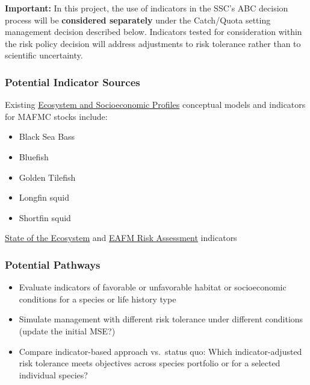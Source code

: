 \documentclass[
]{article}
\providecommand{\tightlist}{%
  \setlength{\itemsep}{0pt}\setlength{\parskip}{0pt}}
\begin{document}
\textbf{Important:} In this project, the use of indicators in the SSC's ABC decision process will be \textbf{considered separately} under the Catch/Quota setting management decision described below. Indicators tested for consideration within the risk policy decision will address adjustments to risk tolerance rather than to scientific uncertainty.

\subsubsection{Potential Indicator Sources}\label{potential-indicator-sources}

Existing \href{https://www.fisheries.noaa.gov/new-england-mid-atlantic/ecosystems/ecosystem-and-socioeconomic-profile-development-and-reports}{Ecosystem and Socioeconomic Profiles} conceptual models and indicators for MAFMC stocks include:

\begin{itemize}
\tightlist
\item
  Black Sea Bass
\item
  Bluefish
\item
  Golden Tilefish
\item
  Longfin squid
\item
  Shortfin squid
\end{itemize}

\href{https://www.fisheries.noaa.gov/new-england-mid-atlantic/ecosystems/state-ecosystem-reports-northeast-us-shelf}{State of the Ecosystem} and \href{https://www.mafmc.org/s/2_MAB_RiskAssess_2024.pdf}{EAFM Risk Assessment} indicators

\subsubsection{Potential Pathways}\label{potential-pathways}

\begin{itemize}
\tightlist
\item
  Evaluate indicators of favorable or unfavorable habitat or socioeconomic conditions for a species or life history type
\item
  Simulate management with different risk tolerance under different conditions (update the initial MSE?)
\item
  Compare indicator-based approach vs.~status quo: Which indicator-adjusted risk tolerance meets objectives across species portfolio or for a selected individual species?
\end{itemize}
\end{document}
